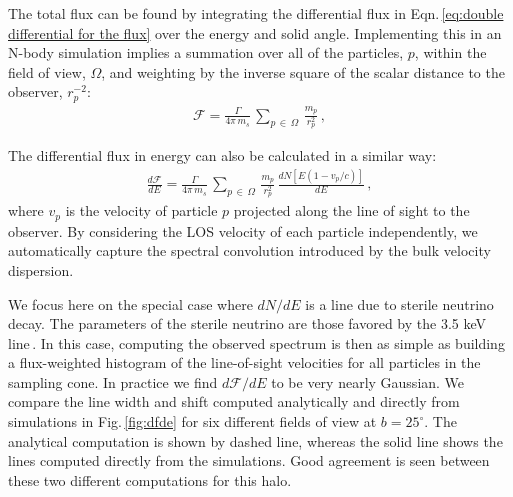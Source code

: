 \documentclass[aps,prd,10pt,twocolumn,superscriptaddress,showpacs]{revtex4-1}
\begin{document}

The total flux can be found by integrating the differential flux in Eqn.\,\ref{eq:double differential for the flux} over the energy and solid angle.  Implementing this in an N-body simulation implies a summation over all of the particles, $p$, within the field of view, $\Omega$, and weighting by the inverse square of the scalar distance to the observer, $r^{-2}_p$:
\begin{eqnarray} 
\mathcal{F} = \frac{\Gamma}{4\pi \, m_s} \, \sum_{p \, \in \, \Omega} \, \frac{m_p}{r_p^{2}} \, ,
\end{eqnarray}

The differential flux in energy can also be calculated in a similar way:
\begin{eqnarray}
\label{eq:discrete}
\frac{d\mathcal{F}}{dE} = \frac{\Gamma}{4 \pi \, m_s}\, \sum_{p \, \in \, \Omega} \,
\frac{m_p}{r_p^{2}} \, \frac{dN[E(1-v_p/c)]}{dE} \, ,
\end{eqnarray}
where $v_p$ is the velocity of particle $p$ projected along the line of sight to the observer.  By
considering the LOS velocity of each particle independently, we automatically capture the spectral
convolution introduced by the bulk velocity dispersion. 

We focus here on the special case where $dN/dE$ is a line due to sterile neutrino decay.  The
parameters of the sterile neutrino are those favored by the 3.5 keV line\,\cite{Bulbul:2014sua}.  In
this case, computing the observed spectrum is then as simple as building a flux-weighted histogram
of the line-of-sight velocities for all particles in the sampling cone. In practice we find
$d\mathcal{F}/dE$ to be very nearly Gaussian. %
We compare the line width and shift computed analytically and directly from simulations in
Fig.\,\ref{fig:dfde} for six different fields of view at $b=25^\circ$.  The analytical computation is 
shown by dashed line, whereas the solid line shows the lines computed directly from the simulations.  
Good agreement is seen between these two different computations for this halo.
\end{document}
